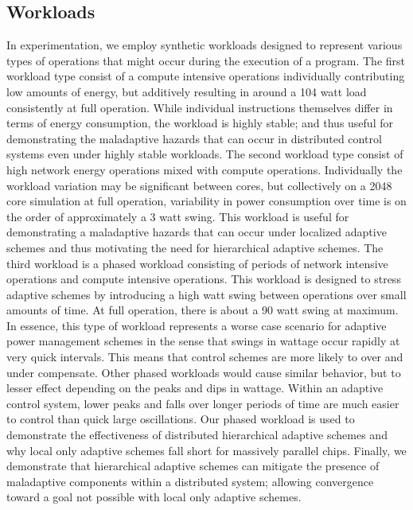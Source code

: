     \subsection{Workloads}
        \label{sec:workloads}
        In experimentation, we employ synthetic workloads designed to represent various types of operations that might occur during the execution of a program. The first workload type consist of a compute intensive operations individually contributing low amounts of energy, but additively resulting in around a 104 watt load consistently at full operation. While individual instructions themselves differ in terms of energy consumption, the workload is highly stable; and thus useful for demonstrating the maladaptive hazards that can occur in distributed control systems even under highly stable workloads. The second workload type consist of high network energy operations mixed with compute operations. Individually the workload variation may be significant between cores, but collectively on a 2048 core simulation at full operation, variability in power consumption over time is on the order of approximately a 3 watt swing. This workload is useful for demonstrating a maladaptive hazards that can occur under localized adaptive schemes and thus motivating the need for hierarchical adaptive schemes. The third workload is a phased workload consisting of periods of network intensive operations and compute intensive operations. This workload is designed to stress adaptive schemes by introducing a high watt swing between operations over small amounts of time. At full operation, there is about a 90 watt swing at maximum. In essence, this type of workload represents a worse case scenario for adaptive power management schemes in the sense that swings in wattage occur rapidly at very quick intervals. This means that control schemes are more likely to over and under compensate. Other phased workloads would cause similar behavior, but to lesser effect depending on the peaks and dips in wattage. Within an adaptive control system, lower peaks and falls over longer periods of time are much easier to control than quick large oscillations. Our phased workload is used to demonstrate the effectiveness of distributed hierarchical adaptive schemes and why local only adaptive schemes fall short for massively parallel chips. Finally, we demonstrate that hierarchical adaptive schemes can mitigate the presence of maladaptive components within a distributed system; allowing convergence toward a goal not possible with local only adaptive schemes.

